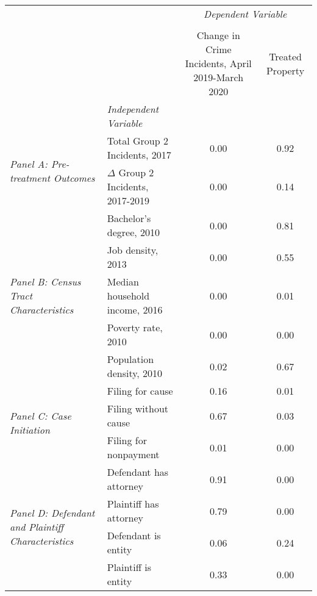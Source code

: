 \begin{tabular}{llcc}
\toprule
 &  & \multicolumn{2}{c}{\textit{Dependent Variable}} \\
\cline{3-4}
\\
 &  & Change in Crime Incidents, April 2019-March 2020 & Treated Property \\
 & \emph{Independent Variable} &  &  \\
\midrule
\multirow[c]{2}{3cm}{\textit{Panel A: Pre-treatment Outcomes}} & Total Group 2 Incidents, 2017 & 0.00 & 0.92 \\
 & $\Delta$ Group 2 Incidents, 2017-2019 & 0.00 & 0.14 \\
\cline{1-4}
\multirow[c]{5}{3cm}{\textit{Panel B: Census Tract Characteristics}} & Bachelor's degree, 2010 & 0.00 & 0.81 \\
 & Job density, 2013 & 0.00 & 0.55 \\
 & Median household income, 2016 & 0.00 & 0.01 \\
 & Poverty rate, 2010 & 0.00 & 0.00 \\
 & Population density, 2010 & 0.02 & 0.67 \\
\cline{1-4}
\multirow[c]{3}{3cm}{\textit{Panel C: Case Initiation}} & Filing for cause & 0.16 & 0.01 \\
 & Filing without cause & 0.67 & 0.03 \\
 & Filing for nonpayment & 0.01 & 0.00 \\
\cline{1-4}
\multirow[c]{4}{3cm}{\textit{Panel D: Defendant and Plaintiff Characteristics}} & Defendant has attorney & 0.91 & 0.00 \\
 & Plaintiff has attorney & 0.79 & 0.00 \\
 & Defendant is entity & 0.06 & 0.24 \\
 & Plaintiff is entity & 0.33 & 0.00 \\
\cline{1-4}
\bottomrule
\end{tabular}
